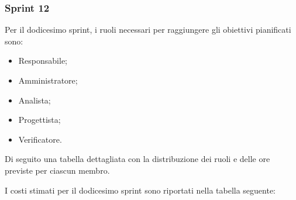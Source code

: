 \pagebreak

\subsubsection{Sprint 12}

Per il dodicesimo sprint, i ruoli necessari per raggiungere gli obiettivi
pianificati sono:
\begin{itemize}
    \item Responsabile;
    \item Amministratore;
    \item Analista;
    \item Progettista;
    \item Verificatore.
\end{itemize}

Di seguito una tabella dettagliata con la distribuzione dei ruoli e delle ore previste per ciascun membro.



I costi stimati per il dodicesimo sprint sono riportati nella tabella seguente:



\pagebreak